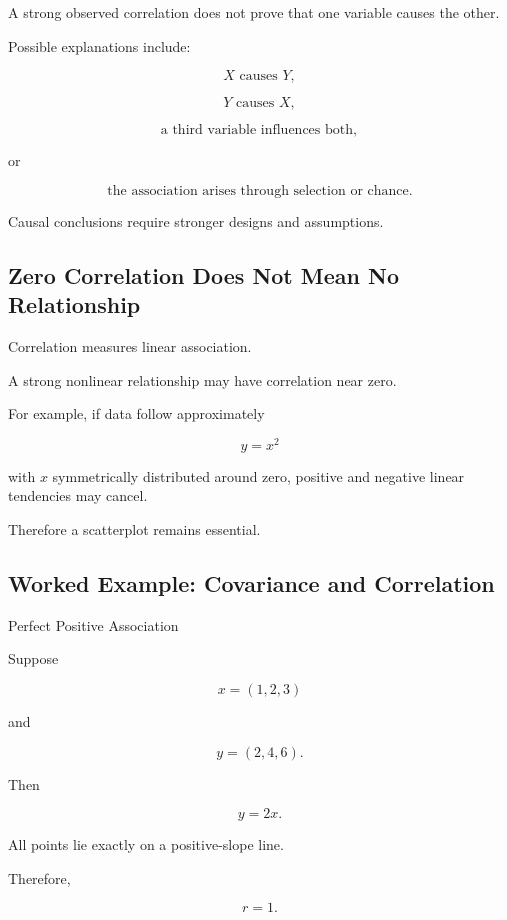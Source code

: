 A strong observed correlation does not prove that one variable causes
the other.

Possible explanations include:

\[
\boxed{
X\text{ causes }Y,
}
\]

\[
\boxed{
Y\text{ causes }X,
}
\]

\[
\boxed{
\text{a third variable influences both},
}
\]

or

\[
\boxed{
\text{the association arises through selection or chance}.
}
\]

Causal conclusions require stronger designs and assumptions.

\subsection{Zero Correlation Does Not Mean No Relationship}
\label{subsec:zero-correlation-nonlinear}

Correlation measures linear association.

A strong nonlinear relationship may have correlation near zero.

For example, if data follow approximately

\[
y=x^2
\]

with \(x\) symmetrically distributed around zero, positive and negative
linear tendencies may cancel.

Therefore a scatterplot remains essential.

\subsection{Worked Example: Covariance and Correlation}
\label{subsec:worked-covariance-correlation}

\begin{workedexamplebox}{Perfect Positive Association}

Suppose

\[
x=(1,2,3)
\]

and

\[
y=(2,4,6).
\]

Then

\[
y=2x.
\]

All points lie exactly on a positive-slope line.

Therefore,

\begin{answerbox}
\[
\boxed{
r=1.
}
\]
\end{answerbox}

\end{workedexamplebox}

